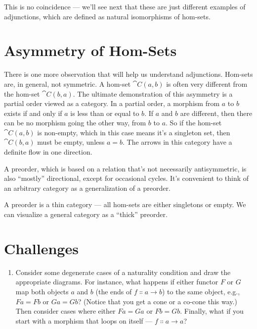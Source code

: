 This is no coincidence --- we'll see next that these are just different
examples of adjunctions, which are defined as natural isomorphisms of
hom-sets.

\section{Asymmetry of Hom-Sets}

There is one more observation that will help us understand adjunctions.
Hom-sets are, in general, not symmetric. A hom-set $\cat{C}(a, b)$ is
often very different from the hom-set $\cat{C}(b, a)$. The ultimate
demonstration of this asymmetry is a partial order viewed as a category.
In a partial order, a morphism from $a$ to $b$ exists if
and only if $a$ is less than or equal to $b$. If
$a$ and $b$ are different, then there can be no morphism
going the other way, from $b$ to $a$. So if the hom-set
$\cat{C}(a, b)$ is non-empty, which in this case means it's a
singleton set, then $\cat{C}(b, a)$ must be empty, unless
$a = b$. The arrows in this category have a definite flow in
one direction.

A preorder, which is based on a relation that's not necessarily
antisymmetric, is also ``mostly'' directional, except for occasional
cycles. It's convenient to think of an arbitrary category as a
generalization of a preorder.

A preorder is a thin category --- all hom-sets are either singletons or
empty. We can visualize a general category as a ``thick'' preorder.

\section{Challenges}

\begin{enumerate}
  \tightlist
  \item
        Consider some degenerate cases of a naturality condition and draw the
        appropriate diagrams. For instance, what happens if either functor
        $F$ or $G$ map both objects $a$ and $b$
        (the ends of $f \Colon a \to b$) to the same
        object, e.g., $F a = F b$ or $G a = G b$?
        (Notice that you get a cone or a co-cone this way.) Then consider
        cases where either $F a = G a$ or $F b = G b$.
        Finally, what if you start with a morphism that loops on itself ---
        $f \Colon a \to a$?
\end{enumerate}